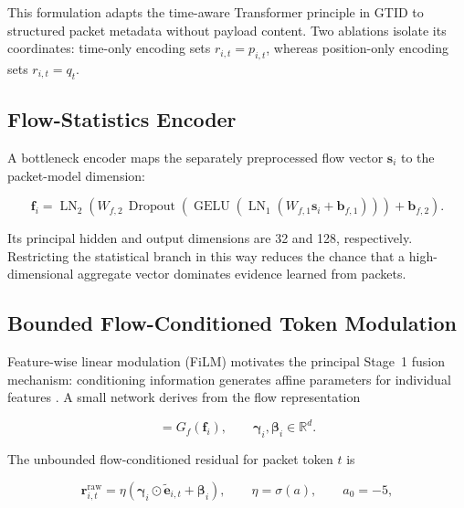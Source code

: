 \documentclass[11pt,fleqn]{report}
\begin{document}
This formulation adapts the time-aware Transformer principle in GTID \cite{Han2023GTID} to structured packet metadata without payload content. Two ablations isolate its coordinates: time-only encoding sets $r_{i,t}=p_{i,t}$, whereas position-only encoding sets $r_{i,t}=q_t$.

\subsection{Flow-Statistics Encoder}
\label{subsubsec:flow_encoder}

A bottleneck encoder maps the separately preprocessed flow vector $\mathbf{s}_i$ to the packet-model dimension:

\begin{equation}
    \mathbf{f}_i
    =\operatorname{LN}_2
    \left(
        W_{f,2}\,
        \operatorname{Dropout}
        \left(
            \operatorname{GELU}
            \left(
                \operatorname{LN}_1(W_{f,1}\mathbf{s}_i+\mathbf{b}_{f,1})
            \right)
        \right)
        +\mathbf{b}_{f,2}
    \right).
    \label{eq:flow_feature_encoder}
\end{equation}

Its principal hidden and output dimensions are 32 and 128, respectively. Restricting the statistical branch in this way reduces the chance that a high-dimensional aggregate vector dominates evidence learned from packets.

\subsection{Bounded Flow-Conditioned Token Modulation}
\label{subsubsec:token_film}

Feature-wise linear modulation (FiLM) motivates the principal Stage~1 fusion mechanism: conditioning information generates affine parameters for individual features \cite{Perez2018FiLM}. A small network derives from the flow representation

\begin{equation}
    [\boldsymbol{\gamma}_i;\boldsymbol{\beta}_i]
    =G_f(\mathbf{f}_i),
    \qquad
    \boldsymbol{\gamma}_i,\boldsymbol{\beta}_i\in\mathbb{R}^{d}.
    \label{eq:film_parameters}
\end{equation}

The unbounded flow-conditioned residual for packet token $t$ is

\begin{equation}
    \mathbf{r}^{\mathrm{raw}}_{i,t}
    =\eta
    \left(
        \boldsymbol{\gamma}_i\odot\widetilde{\mathbf{e}}_{i,t}
        +\boldsymbol{\beta}_i
    \right),
    \qquad
    \eta=\sigma(a),\qquad a_{0}=-5,
    \label{eq:film_raw_residual}
\end{equation}
\end{document}
